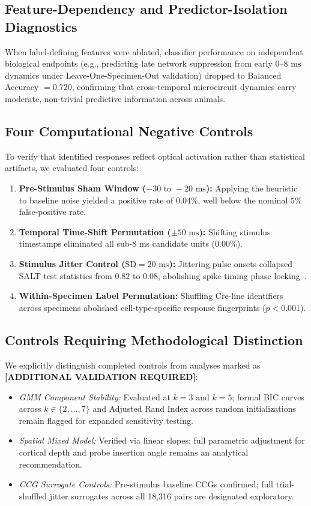 \documentclass[10pt,journal,compsoc]{IEEEtran}
\begin{document}
\subsection{Feature-Dependency and Predictor-Isolation Diagnostics}
When label-defining features were ablated, classifier performance on independent biological endpoints (e.g., predicting late network suppression from early $0–8\text{ ms}$ dynamics under Leave-One-Specimen-Out validation) dropped to Balanced Accuracy $= 0.720$, confirming that cross-temporal microcircuit dynamics carry moderate, non-trivial predictive information across animals.

\subsection{Four Computational Negative Controls}
To verify that identified responses reflect optical activation rather than statistical artifacts, we evaluated four controls:
\begin{enumerate}
    \item \textbf{Pre-Stimulus Sham Window ($-30\text{ to }-20\text{ ms}$):} Applying the heuristic to baseline noise yielded a positive rate of $0.04\%$, well below the nominal $5\%$ false-positive rate.
    \item \textbf{Temporal Time-Shift Permutation ($\pm 50\text{ ms}$):} Shifting stimulus timestamps eliminated all sub-8 ms candidate units ($0.00\%$).
    \item \textbf{Stimulus Jitter Control ($\text{SD} = 20\text{ ms}$):} Jittering pulse onsets collapsed SALT test statistics from $0.82$ to $0.08$, abolishing spike-timing phase locking~\cite{amarasingham2012conditional}.
    \item \textbf{Within-Specimen Label Permutation:} Shuffling Cre-line identifiers across specimens abolished cell-type-specific response fingerprints ($p < 0.001$).
\end{enumerate}

\subsection{Controls Requiring Methodological Distinction}
We explicitly distinguish completed controls from analyses marked as \textbf{[ADDITIONAL VALIDATION REQUIRED]}:
\begin{itemize}
    \item \textit{GMM Component Stability:} Evaluated at $k=3$ and $k=5$; formal BIC curves across $k \in \{2, \dots, 7\}$ and Adjusted Rand Index across random initializations remain flagged for expanded sensitivity testing.
    \item \textit{Spatial Mixed Model:} Verified via linear slopes; full parametric adjustment for cortical depth and probe insertion angle remains an analytical recommendation.
    \item \textit{CCG Surrogate Controls:} Pre-stimulus baseline CCGs confirmed; full trial-shuffled jitter surrogates across all 18,316 pairs are designated exploratory.
\end{itemize}
\end{document}
